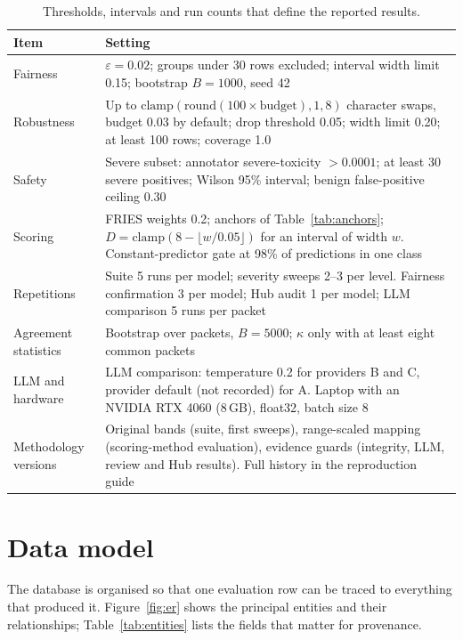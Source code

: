 \begin{table}[!htbp]
\centering\footnotesize
\caption{Thresholds, intervals and run counts that define the reported results.}\label{tab:appconfig}
\begin{tabularx}{\textwidth}{|>{\raggedright\arraybackslash}p{3.6cm}|L|}
\hline
\textbf{Item} & \textbf{Setting}\\
\hline
Fairness & $\varepsilon=0.02$; groups under 30 rows excluded; interval width limit 0.15; bootstrap $B=1000$, seed 42\\ \hline
Robustness & Up to $\mathrm{clamp}(\mathrm{round}(100\times\text{budget}),1,8)$ character swaps, budget 0.03 by default; drop threshold 0.05; width limit 0.20; at least 100 rows; coverage 1.0\\ \hline
Safety & Severe subset: annotator severe-toxicity $>0.0001$; at least 30 severe positives; Wilson 95\% interval; benign false-positive ceiling 0.30\\ \hline
Scoring & FRIES weights 0.2; anchors of Table~\ref{tab:anchors}; $D=\mathrm{clamp}(8-\lfloor w/0.05\rfloor)$ for an interval of width $w$. Constant-predictor gate at 98\% of predictions in one class\\ \hline
Repetitions & Suite 5 runs per model; severity sweeps 2--3 per level. Fairness confirmation 3 per model; Hub audit 1 per model; LLM comparison 5 runs per packet\\ \hline
Agreement statistics & Bootstrap over packets, $B=5000$; $\kappa$ only with at least eight common packets\\ \hline
LLM and hardware & LLM comparison: temperature 0.2 for providers B and C, provider default (not recorded) for A. Laptop with an NVIDIA RTX 4060 (8\,GB), float32, batch size 8\\ \hline
Methodology versions & Original bands (suite, first sweeps), range-scaled mapping (scoring-method evaluation), evidence guards (integrity, LLM, review and Hub results). Full history in the reproduction guide\\
\hline
\end{tabularx}
\end{table}

\section{Data model}\label{app:datamodel}
The database is organised so that one evaluation row can be traced to everything that produced it. Figure~\ref{fig:er} shows the principal entities and their relationships; Table~\ref{tab:entities} lists the fields that matter for provenance.


